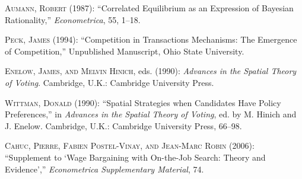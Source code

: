 \documentclass[ecta,nameyear,draft]{econsocart}
\theoremstyle{plain}
\theoremstyle{remark}
\begin{document}


\begin{thebibliography}{}
%
\textsc{Aumann, Robert} (1987):
``Correlated Equilibrium as an Expression of Bayesian Rationality,''
\textit{Econometrica}, 55, 1--18.
\endbibitem

\textsc{Peck, James} (1994):
``Competition in Transactions Mechanisms: The Emergence of Competition,''
Unpublished Manuscript, Ohio State University.
\endbibitem

\textsc{Enelow, James, and Melvin Hinich}, eds. (1990):
\textit{Advances in the Spatial Theory of Voting}.
Cambridge, U.K.: Cambridge University Press.
\endbibitem

\textsc{Wittman, Donald} (1990):
``Spatial Strategies when Candidates Have Policy Preferences,''
in \textit{Advances in the Spatial Theory of Voting},
ed. by M. Hinich and J. Enelow.
Cambridge, U.K.: Cambridge University Press, 66--98.
\endbibitem

\textsc{Cahuc, Pierre, Fabien Postel-Vinay, and Jean-Marc Robin} (2006): ``Supplement to `Wage Bargaining with On-the-Job Search: Theory and Evidence',''
\textit{Econometrica Supplementary Material}, 74.
\endbibitem
\end{thebibliography}
\end{document}
